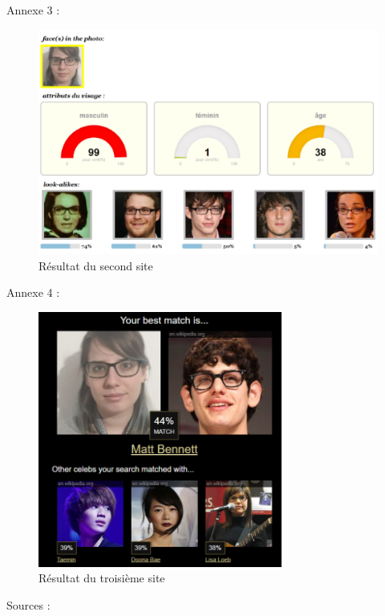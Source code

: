 \documentclass[a4paper,12pt]{article}
\begin{document}
  \newpage
Annexe 3 : 
\begin{figure}[!ht]
    \centering
        \includegraphics[scale=1]{images/ResS2.PNG}
        \caption{Résultat du second site}
    \end{figure} 
\newpage
Annexe 4 :
\begin{figure}[!ht]
    \centering
        \includegraphics[scale=1]{images/ResS3.PNG}
        \caption{Résultat du troisième site}
    \end{figure}
\newpage
Sources : 
\end{document}

